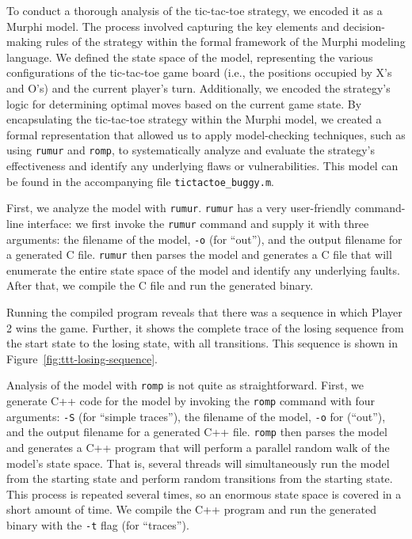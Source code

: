 To conduct a thorough analysis of the tic-tac-toe strategy,
we encoded it as a Murphi model.
The process involved capturing the key elements and decision-making rules of
the strategy within the formal framework of the Murphi modeling language.
We defined the state space of the model, representing the various
configurations of the tic-tac-toe game board
(i.e., the positions occupied by X's and O's) and the current player's turn.
Additionally, we encoded the strategy's logic for determining optimal moves
based on the current game state.
By encapsulating the tic-tac-toe strategy within the Murphi model,
we created a formal representation that allowed us to apply model-checking
techniques, such as using \texttt{rumur} and \texttt{romp},
to systematically analyze and evaluate the strategy's effectiveness and
identify any underlying flaws or vulnerabilities.
This model can be found in the accompanying file \texttt{tictactoe\_buggy.m}.

First, we analyze the model with \texttt{rumur}.
\texttt{rumur} has a very user-friendly command-line interface:
we first invoke the \texttt{rumur} command and supply it with three arguments:
the filename of the model, \texttt{-o} (for ``out''), and the output filename
for a generated C file.
\texttt{rumur} then parses the model and generates a C file that will enumerate
the entire state space of the model and identify any underlying faults.
After that, we compile the C file and run the generated binary.

Running the compiled program reveals that there was a sequence in which
Player 2 wins the game.
Further, it shows the complete trace of the losing sequence from the start
state to the losing state, with all transitions.
This sequence is shown in Figure~\ref{fig:ttt-losing-sequence}.

Analysis of the model with \texttt{romp} is not quite as straightforward.
First, we generate C++ code for the model by invoking the \texttt{romp}
command with four arguments: \texttt{-S} (for ``simple traces''), the
filename of the model, \texttt{-o} for (``out''), and the output filename
for a generated C++ file.
\texttt{romp} then parses the model and generates a C++ program that will
perform a parallel random walk of the model's state space.
That is, several threads will simultaneously run the model from the starting
state and perform random transitions from the starting state.
This process is repeated several times, so an enormous state space is covered
in a short amount of time.
We compile the C++ program and run the generated binary with the
\texttt{-t} flag (for ``traces'').

